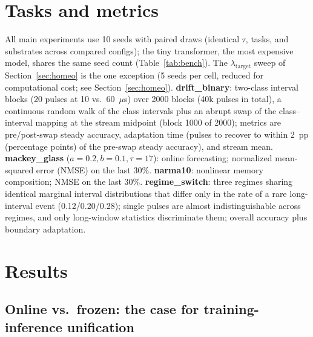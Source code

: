 \documentclass[11pt]{article}
\begin{document}
\section{Tasks and metrics}
\label{sec:tasks}

All main experiments use 10 seeds with paired draws (identical $\tau$, tasks, and
substrates across compared configs); the tiny transformer, the most expensive
model, shares the same seed count (Table~\ref{tab:bench}). The
$\lambda_{\mathrm{target}}$ sweep of Section~\ref{sec:homeo} is the one
exception (5 seeds per cell, reduced for computational cost; see
Section~\ref{sec:homeo}).
\textbf{drift\_binary}: two-class interval
blocks (20 pulses at 10 vs.\ 60~$\mu$s) over 2000 blocks (40k pulses in
total), a continuous random walk of the class intervals plus an abrupt swap
of the class--interval mapping at the stream midpoint (block 1000 of 2000);
metrics are pre/post-swap steady accuracy, adaptation time
(pulses to recover to within 2~pp (percentage points) of the pre-swap steady accuracy), and stream
mean. \textbf{mackey\_glass} ($a=0.2,b=0.1,\tau=17$): online forecasting;
normalized mean-squared error (NMSE)
on the last 30\%. \textbf{narma10}: nonlinear memory composition; NMSE on the
last 30\%. \textbf{regime\_switch}: three regimes sharing identical marginal
interval distributions that differ only in the rate of a rare long-interval
event (0.12/0.20/0.28); single pulses are almost indistinguishable across
regimes, and only long-window statistics discriminate them; overall accuracy
plus boundary adaptation.

\section{Results}
\label{sec:results}

\subsection{Online vs.\ frozen: the case for training-inference unification}
\label{sec:online}
\end{document}
